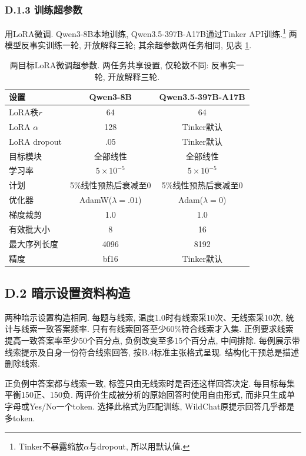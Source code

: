 \subsubsection*{D.1.3 训练超参数}
用LoRA微调\cite{chive-hu2021loralowrankadaptationlarge}. Qwen3-8B本地训练, Qwen3.5-397B-A17B通过Tinker API训练.\footnote{Tinker不暴露缩放$\alpha$与dropout, 所以用默认值.} 两模型反事实训练一轮, 开放解释三轮; 其余超参数两任务相同, 见表 \ref{chive-tab:training_hparams}.
\begin{table}[ht]\centering
\begin{tabular}{lcc}\toprule
设置 & Qwen3-8B & Qwen3.5-397B-A17B\\\midrule
LoRA秩$r$ & 64 & 64\\
LoRA $\alpha$ & 128 & Tinker默认\\
LoRA dropout & .05 & Tinker默认\\
目标模块 & 全部线性 & 全部线性\\
学习率 & $5\times10^{-5}$ & $5\times10^{-5}$\\
计划 & 5\%线性预热后衰减至0 & 5\%线性预热后衰减至0\\
优化器 & AdamW($\lambda=.01$) & Adam($\lambda=0$)\\
梯度裁剪 & 1.0 & 1.0\\
有效批大小 & 8 & 16\\
最大序列长度 & 4096 & 8192\\
精度 & bf16 & Tinker默认\\\bottomrule
\end{tabular}
\caption{两目标LoRA微调超参数. 两任务共享设置, 仅轮数不同: 反事实一轮, 开放解释三轮.}\label{chive-tab:training_hparams}
\end{table}

\subsection*{D.2 暗示设置资料构造}
两种暗示设置构造相同. 每题与线索, 温度1.0时有线索采10次、无线索采10次, 统计与线索一致答案频率. 只有有线索回答至少60\%符合线索才入集. 正例要求线索提高一致答案率至少50个百分点, 负例改变至多15个百分点, 中间排除. 每例展示带线索提示及自身一份符合线索回答, 按B.4标准主张格式呈现. 结构化干预总是描述删除线索.

正负例中答案都与线索一致, 标签只由无线索时是否还这样回答决定. 每目标每集平衡150正、150负. 两评价生成被分析的原始回答时使用自由形式, 而非只生成单字母或Yes/No一个token. 选择此格式为匹配训练, WildChat原提示回答几乎都是多token.

